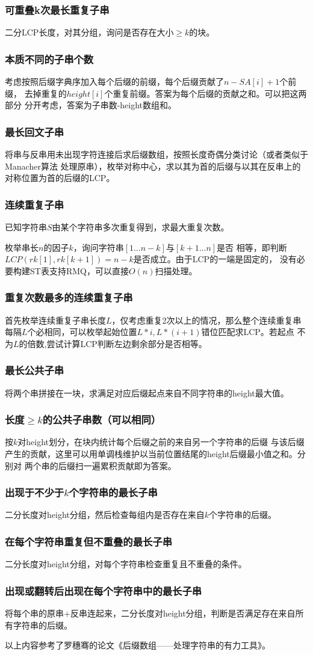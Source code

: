 \subsubsection{可重叠k次最长重复子串}
二分LCP长度，对其分组，询问是否存在大小$\geq k$的块。
\subsubsection{本质不同的子串个数}
考虑按照后缀字典序加入每个后缀的前缀，每个后缀贡献了$n-SA[i]+1$个前缀，
去掉重复的$height[i]$个重复前缀。答案为每个后缀的贡献之和。可以把这两部分
分开考虑，答案为子串数-height数组和。
\subsubsection{最长回文子串}
将串与反串用未出现字符连接后求后缀数组，按照长度奇偶分类讨论（或者类似于Manacher算法
处理原串），枚举对称中心，求以其为首的后缀与以其在反串上的对称位置为首的后缀的LCP。
\subsubsection{连续重复子串}
已知字符串$S$由某个字符串多次重复得到，求最大重复次数。

枚举串长$n$的因子$k$，询问字符串$[1\ldots n-k]$与$[k+1\ldots n]$是否
相等，即判断$LCP(rk[1],rk[k+1])=n-k$是否成立。由于LCP的一端是固定的，
没有必要构建ST表支持RMQ，可以直接$O(n)$扫描处理。
\subsubsection{重复次数最多的连续重复子串}
首先枚举连续重复子串长度$L$，仅考虑重复2次以上的情况，那么整个连续重复串
每隔$L$个必相同，可以枚举起始位置$L*i,L*(i+1)$错位匹配求LCP。若起点
不为$L$的倍数,尝试计算LCP判断左边剩余部分是否相等。
\subsubsection{最长公共子串}
将两个串拼接在一块，求满足对应后缀起点来自不同字符串的height最大值。
\subsubsection{长度$\geq k$的公共子串数（可以相同）}
按$k$对height划分，在块内统计每个后缀之前的来自另一个字符串的后缀
与该后缀产生的贡献，这里可以用单调栈维护以当前位置结尾的height后缀最小值之和。分别对
两个串的后缀扫一遍累积贡献即为答案。
\subsubsection{出现于不少于$k$个字符串的最长子串}
二分长度对height分组，然后检查每组内是否存在来自$k$个字符串的后缀。
\subsubsection{在每个字符串重复但不重叠的最长子串}
二分长度对height分组，对每个字符串检查重复且不重叠的条件。
\subsubsection{出现或翻转后出现在每个字符串中的最长子串}
将每个串的原串+反串连起来，二分长度对height分组，判断是否满足存在来自所有字符串的后缀。

以上内容参考了罗穗骞的论文《后缀数组——处理字符串的有力工具》。
